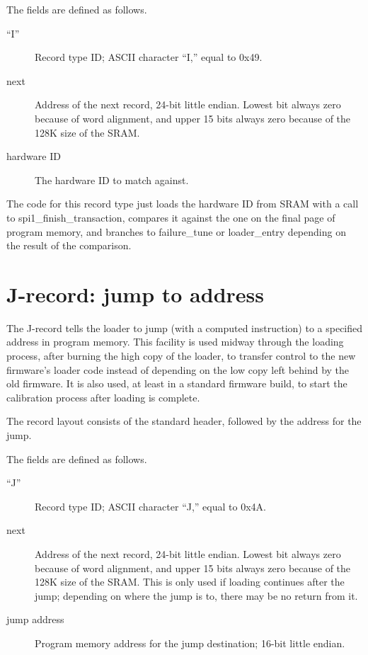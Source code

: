 The fields are defined as follows.

\begin{description}
  \item[``I''] Record type ID; ASCII character ``I,'' equal to 0x49.
  \item[next] Address of the next record, 24-bit little endian.  Lowest bit
    always zero because of word alignment, and upper 15 bits always zero
    because of the 128K size of the SRAM.
  \item[hardware ID] The hardware ID to match against.
\end{description}

The code for this record type just loads the hardware ID from SRAM with a
call to spi1\_finish\_transaction, compares it against the one on the final
page of program memory, and branches to failure\_tune or loader\_entry
depending on the result of the comparison.

\section{J-record: jump to address}

The J-record tells the loader to jump (with a computed 
instruction) to a specified address in program memory.  This facility is
used midway through the loading process, after burning the high copy of the
loader, to transfer control to the new firmware's loader code instead of
depending on the low copy left behind by the old firmware.  It is also used,
at least in a standard firmware build, to start the calibration process
after loading is complete.

The record layout consists of the standard header, followed by the address
for the jump.


The fields are defined as follows.

\begin{description}
  \item[``J''] Record type ID; ASCII character ``J,'' equal to 0x4A.
  \item[next] Address of the next record, 24-bit little endian.  Lowest bit
    always zero because of word alignment, and upper 15 bits always zero
    because of the 128K size of the SRAM.  This is only used if loading
    continues after the jump; depending on where the jump is to, there may
    be no return from it.
  \item[jump address] Program memory address for the jump destination;
    16-bit little endian.
\end{description}

